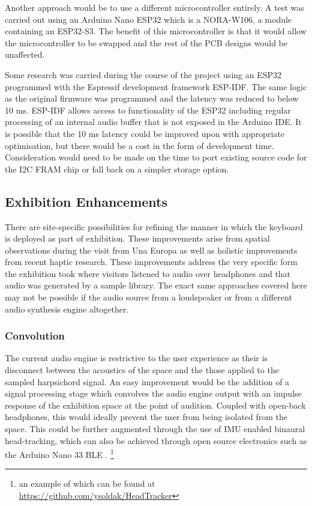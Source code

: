 Another approach would be to use a different microcontroller entirely. A test
was carried out using an Arduino Nano ESP32 which is a NORA-W106, a module
containing an ESP32-S3. The benefit of this microcontroller is that it would
allow the microcontroller to be swapped and the rest of the PCB designs would be
unaffected.

Some research was carried during the course of the project using an ESP32
programmed with the Espressif development framework ESP-IDF. The same logic as
the original firmware was programmed and the latency was reduced to below 10 ms.
ESP-IDF allows access to functionality of the ESP32 including regular processing
of an internal audio buffer that is not exposed in the Arduino IDE. It is
possible that the 10 ms latency could be improved upon with appropriate
optimisation, but there would be a cost in the form of development time.
Consideration would need to be made on the time to port existing source code for
the I2C FRAM chip or fall back on a simpler storage option.

\subsection{Exhibition Enhancements}

There are site-specific possibilities for refining the manner in which the
keyboard is deployed as part of exhibition. These improvements arise from
spatial observations during the visit from Una Europa as well as holistic
improvements from recent haptic research. These improvements address the very
specific form the exhibition took where visitors listened to audio over
headphones and that audio was generated by a sample library. The exact same
approaches covered here may not be possible if the audio source from a
loudspeaker or from a different audio synthesis engine altogether.

\subsubsection{Convolution}

The current audio engine is restrictive to the user experience as their is
disconnect between the acoustics of the space and the those applied to the
sampled harpsichord signal. An easy improvement would be the addition of a
signal processing stage which convolves the audio engine output with an impulse
response of the exhibition space at the point of audition. Coupled with
open-back headphones, this would ideally prevent the user from being isolated
from the space. This could be further augmented through the use of IMU enabled
binaural head-tracking, which can also be achieved through open source
electronics such as the Arduino Nano 33 BLE \cite{franvcek_performance_2023}.%
\footnote{an example of which can be found at
    \url{https://github.com/ysoldak/HeadTracker}}

